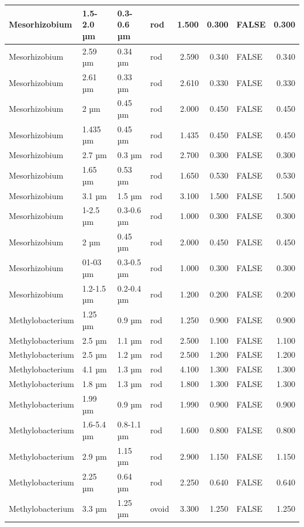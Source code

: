 \documentclass[
]{article}
\begin{document}
\begin{table}
\begin{tabular}{l|l|l|l|r|r|l|r}
\hline
Mesorhizobium & 1.5-2.0 µm & 0.3-0.6 µm & rod & 1.500 & 0.300 & FALSE & 0.300\\
\hline
Mesorhizobium & 2.59 µm & 0.34 µm & rod & 2.590 & 0.340 & FALSE & 0.340\\
\hline
Mesorhizobium & 2.61 µm & 0.33 µm & rod & 2.610 & 0.330 & FALSE & 0.330\\
\hline
Mesorhizobium & 2 µm & 0.45 µm & rod & 2.000 & 0.450 & FALSE & 0.450\\
\hline
Mesorhizobium & 1.435 µm & 0.45 µm & rod & 1.435 & 0.450 & FALSE & 0.450\\
\hline
Mesorhizobium & 2.7 µm & 0.3 µm & rod & 2.700 & 0.300 & FALSE & 0.300\\
\hline
Mesorhizobium & 1.65 µm & 0.53 µm & rod & 1.650 & 0.530 & FALSE & 0.530\\
\hline
Mesorhizobium & 3.1 µm & 1.5 µm & rod & 3.100 & 1.500 & FALSE & 1.500\\
\hline
Mesorhizobium & 1-2.5 µm & 0.3-0.6 µm & rod & 1.000 & 0.300 & FALSE & 0.300\\
\hline
Mesorhizobium & 2 µm & 0.45 µm & rod & 2.000 & 0.450 & FALSE & 0.450\\
\hline
Mesorhizobium & 01-03 µm & 0.3-0.5 µm & rod & 1.000 & 0.300 & FALSE & 0.300\\
\hline
Mesorhizobium & 1.2-1.5 µm & 0.2-0.4 µm & rod & 1.200 & 0.200 & FALSE & 0.200\\
\hline
Methylobacterium & 1.25 µm & 0.9 µm & rod & 1.250 & 0.900 & FALSE & 0.900\\
\hline
Methylobacterium & 2.5 µm & 1.1 µm & rod & 2.500 & 1.100 & FALSE & 1.100\\
\hline
Methylobacterium & 2.5 µm & 1.2 µm & rod & 2.500 & 1.200 & FALSE & 1.200\\
\hline
Methylobacterium & 4.1 µm & 1.3 µm & rod & 4.100 & 1.300 & FALSE & 1.300\\
\hline
Methylobacterium & 1.8 µm & 1.3 µm & rod & 1.800 & 1.300 & FALSE & 1.300\\
\hline
Methylobacterium & 1.99 µm & 0.9 µm & rod & 1.990 & 0.900 & FALSE & 0.900\\
\hline
Methylobacterium & 1.6-5.4 µm & 0.8-1.1 µm & rod & 1.600 & 0.800 & FALSE & 0.800\\
\hline
Methylobacterium & 2.9 µm & 1.15 µm & rod & 2.900 & 1.150 & FALSE & 1.150\\
\hline
Methylobacterium & 2.25 µm & 0.64 µm & rod & 2.250 & 0.640 & FALSE & 0.640\\
\hline
Methylobacterium & 3.3 µm & 1.25 µm & ovoid & 3.300 & 1.250 & FALSE & 1.250\\

\end{tabular}
\end{table}
\end{document}
